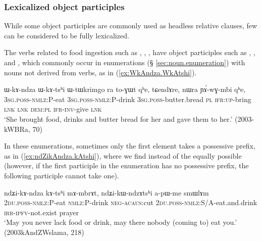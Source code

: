 \subsubsection{Lexicalized object participles} \label{sec:lexicalized.object.participle}
While some object participles are commonly used as headless relative clauses, few can be considered to be fully lexicalized. 

The verbs related to food ingestion such as , , ,  have object participles such as , ,  and , which commonly occur in enumerations (§ \ref{sec:noun.enumeration}) with nouns not derived from verbs, as in (\ref{ex:WkAndza.WkAtshi}).  

\begin{exe}
\ex \label{ex:WkAndza.WkAtshi}
\gll  ɯ-kɤ-ndza ɯ-kɤ-tsʰi ɯ-tɯkrimgo ra to-ɣɯt qʰe, tɕendɤre, nɯra ɲɤ́-wɣ-mbi qʰe, \\
\textsc{3sg}.\textsc{poss}-\textsc{nmlz}:P-eat \textsc{3sg}.\textsc{poss}-\textsc{nmlz}:P-drink \textsc{3sg}.\textsc{poss}-butter.bread \textsc{pl} \textsc{ifr}:\textsc{up}-bring \textsc{lnk} \textsc{lnk} \textsc{dem}:\textsc{pl} \textsc{ifr}-\textsc{inv}-give \textsc{lnk} \\
 \glt  `She brought food, drinks and butter bread for her and gave them to her.' (2003-kWBRa, 70)
\end{exe}

In these enumerations, sometimes only the first element takes a possessive prefix, as in (\ref{ex:ndZikAndza.kAtshi}), where we find  instead of the equally possible  (however, if the first  participle in the enumeration has no possessive prefix, the following participle cannot take one).

\begin{exe}
\ex \label{ex:ndZikAndza.kAtshi}
\gll  ndʑi-kɤ-ndza kɤ-tsʰi mɤ-mbrɤt, ndʑi-kɯ-ndzɤtsʰi a-pɯ-me smɯlɤm \\
\textsc{2du}.\textsc{poss}-\textsc{nmlz}:P-eat \textsc{nmlz}:P-drink \textsc{neg}-\textsc{acaus}:cut  \textsc{2du}.\textsc{poss}-\textsc{nmlz}:S/A-eat.and.drink \textsc{irr}-\textsc{ipfv}-not.exist prayer \\
\glt `May you never lack food or drink, may there nobody (coming to) eat you.' (2003kAndZWslama, 218)
\end{exe}

